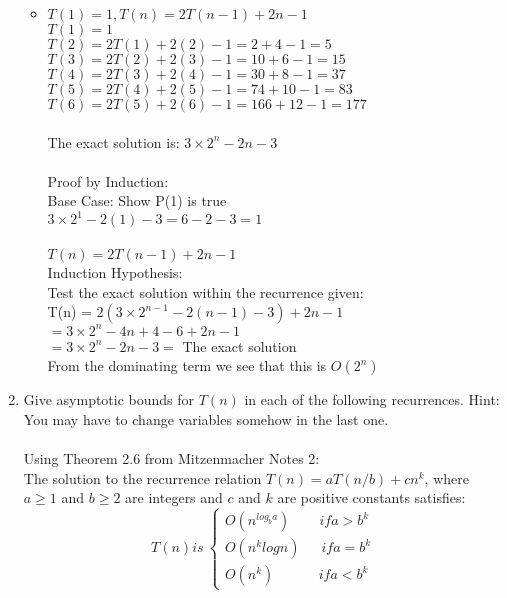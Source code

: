 \documentclass[11pt]{article}
\begin{document}
\begin{enumerate}
\begin {itemize}
\item $T(1) = 1, T(n) = 2T(n-1)+2n-1$\\
$T(1) = 1$\\
$T(2) = 2T(1)+2(2)-1 = 2+4-1=5$\\
$T(3) = 2T(2)+2(3)-1= 10+6-1=15$\\
$T(4) = 2T(3) +2(4)-1=30+8-1=37$\\
$T(5) = 2T(4)+2(5)-1 = 74+10-1=83$\\
$T(6)=2T(5)+2(6)-1=166+12-1=177$\\\\
The exact solution is: $3 \times 2^n-2n-3$\\\\
Proof by Induction:\\
Base Case: Show P(1) is true\\
$3 \times 2^1-2(1)-3 = 6-2-3=1$\\\\
$T(n) = 2T(n-1)+2n-1$\\
Induction Hypothesis:\\
Test the exact solution within the recurrence given:\\
T(n) = $2(3 \times 2^{n-1}-2(n-1)-3 )+ 2n -1$\\
$= 3 \times 2^n - 4n +4-6+2n-1$\\
$=3 \times 2^n -2n -3 = $ The exact solution\\
From the dominating term we see that this is $O(2^n)$

\end {itemize}



\item Give asymptotic bounds for $T(n)$ in each of the following recurrences. Hint: You may have to change variables somehow in the last one.\\\\
Using Theorem 2.6 from Mitzenmacher Notes 2:\\
The solution to the recurrence relation $T(n) = aT(n/b)+cn^k$, where $a\geq 1$ and $b\geq 2$ are integers and $c$ and $k$ are positive constants satisfies:\\
\begin{equation*} T(n) is \
\begin{cases}
O(n^{log_ba})  \hspace{25pt} if a >b^k\\    O(n^klogn)  \hspace{18pt} if a =b^k\\ O(n^k)  \hspace{38pt} if a <b^k \end{cases}
\end{equation*}


\end{enumerate}
\end{document}
